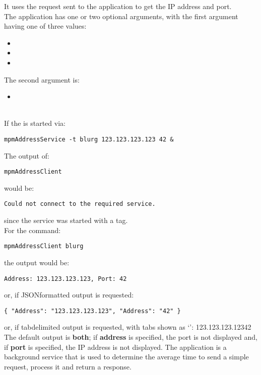 It uses the  request sent to the
 application to get the IP address and port.\\

The application has one or two optional arguments, with the first argument having one of
three values:
\begin{itemize}
\item{}
\item\exSp{}
\item\exSp{}
\end{itemize}
The second argument is:
\begin{itemize}
\item{}
\end{itemize}

\insertFullClientParameters\\

If the  is started via:
\outputBegin
\begin{verbatim}
mpmAddressService -t blurg 123.123.123.123 42 &
\end{verbatim}
\outputEnd{}
The output of:
\outputBegin
\begin{verbatim}
mpmAddressClient
\end{verbatim}
\outputEnd{}
would be:
\outputBegin
\begin{verbatim}
Could not connect to the required service.
\end{verbatim}
\outputEnd{}
since the service was started with a tag.\\

For the command:
\outputBegin
\begin{verbatim}
mpmAddressClient blurg
\end{verbatim}
\outputEnd{}
the output would be:
\outputBegin
\begin{verbatim}
Address: 123.123.123.123, Port: 42
\end{verbatim}
\outputEnd{}
or, if JSON\longDash{}formatted output is requested:
\outputBegin
\begin{verbatim}
{ "Address": "123.123.123.123", "Address": "42" }
\end{verbatim}
\outputEnd{}
or, if tab\longDash{}delimited output is requested, with tabs shown as `\tabSymbol':
\outputBegin{}
123.123.123.123\pseudotab{}42
\outputEnd{}
The default output is \textbf{both}; if \textbf{address} is specified, the port is not
displayed and, if \textbf{port} is specified, the IP address is not displayed.
The  application is a background service that is
used to determine the average time to send a simple request, process it and return a
response.\\

